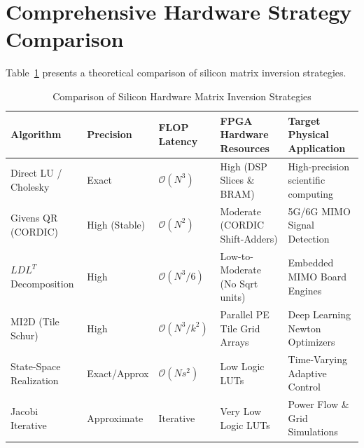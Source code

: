 \section{Comprehensive Hardware Strategy Comparison}
Table~\ref{tab:ch08_hardware_comparison} presents a theoretical comparison of silicon matrix inversion strategies.

\begin{table}[htbp]
\centering
\caption{Comparison of Silicon Hardware Matrix Inversion Strategies}
\label{tab:ch08_hardware_comparison}
\begin{tabularx}{\textwidth}{>{\raggedright\arraybackslash}p{3.0cm} >{\raggedright\arraybackslash}p{2.0cm} >{\raggedright\arraybackslash}p{2.2cm} >{\raggedright\arraybackslash}X >{\raggedright\arraybackslash}p{3.0cm}}
\toprule
\textbf{Algorithm} & \textbf{Precision} & \textbf{FLOP Latency} & \textbf{FPGA Hardware Resources} & \textbf{Target Physical Application} \\
\midrule
Direct LU / Cholesky & Exact & $\mathcal{O}(N^3)$ & High (DSP Slices \& BRAM) & High-precision scientific computing \\
Givens QR (CORDIC) & High (Stable) & $\mathcal{O}(N^2)$ & Moderate (CORDIC Shift-Adders) & 5G/6G MIMO Signal Detection \\
$L D L^T$ Decomposition & High & $\mathcal{O}(N^3/6)$ & Low-to-Moderate (No Sqrt units) & Embedded MIMO Board Engines \\
MI2D (Tile Schur) & High & $\mathcal{O}(N^3/k^2)$ & Parallel PE Tile Grid Arrays & Deep Learning Newton Optimizers \\
State-Space Realization & Exact/Approx & $\mathcal{O}(N s^2)$ & Low Logic LUTs & Time-Varying Adaptive Control \\
Jacobi Iterative & Approximate & Iterative & Very Low Logic LUTs & Power Flow \& Grid Simulations \\
\bottomrule
\end{tabularx}
\end{table}

